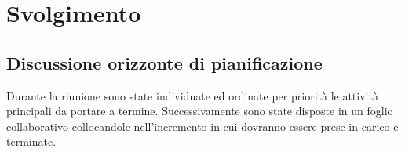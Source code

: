 \section{Svolgimento}

\subsection{Discussione orizzonte di pianificazione}
Durante la riunione sono state individuate ed ordinate per priorità le attività principali da portare a termine. Successivamente sono state disposte in un foglio collaborativo collocandole nell'incremento in cui dovranno essere prese in carico e terminate.